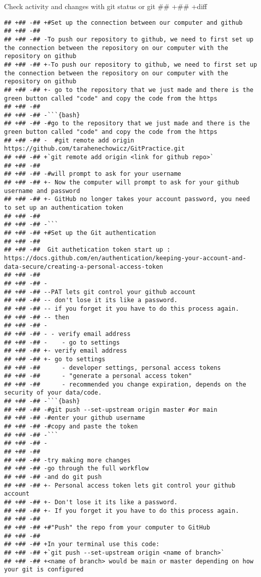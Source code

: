 \documentclass[ignorenonframetext,]{beamer}
\begin{document}
\begin{frame}[fragile]{Check activity and changes with git status or git
## +## +diff}
\begin{verbatim}
## +## -## +#Set up the connection between our computer and github
## +## -##  
## +## -## -To push our repository to github, we need to first set up the connection between the repository on our computer with the repository on github
## +## -## +-To push our repository to github, we need to first set up the connection between the repository on our computer with the repository on github
## +## -## +- go to the repository that we just made and there is the green button called "code" and copy the code from the https
## +## -##  
## +## -## -```{bash}
## +## -## -#go to the repository that we just made and there is the green button called "code" and copy the code from the https
## +## -## -  #git remote add origin https://github.com/tarahenechowicz/GitPractice.git
## +## -## +`git remote add origin <link for github repo>`
## +## -##  
## +## -## -#will prompt to ask for your username
## +## -## +- Now the computer will prompt to ask for your github username and password
## +## -## +- GitHub no longer takes your account password, you need to set up an authentication token
## +## -##  
## +## -## -```
## +## -## +#Set up the Git authentication 
## +## -##  
## +## -##  Git authetication token start up : https://docs.github.com/en/authentication/keeping-your-account-and-data-secure/creating-a-personal-access-token
## +## -##  
## +## -## -
## +## -## --PAT lets git control your github account
## +## -## -- don't lose it its like a password. 
## +## -## -- if you forget it you have to do this process again.
## +## -## -- then 
## +## -## -
## +## -## - - verify email address
## +## -## -    - go to settings
## +## -## +- verify email address
## +## -## +- go to settings
## +## -##      - developer settings, personal access tokens
## +## -##      - "generate a personal access token"
## +## -##      - recommended you change expiration, depends on the security of your data/code. 
## +## -## -```{bash}
## +## -## -#git push --set-upstream origin master #or main
## +## -## -#enter your github username
## +## -## -#copy and paste the token
## +## -## -```
## +## -## - 
## +## -##  
## +## -## -try making more changes
## +## -## -go through the full workflow
## +## -## -and do git push
## +## -## +- Personal access token lets git control your github account
## +## -## +- Don't lose it its like a password. 
## +## -## +- If you forget it you have to do this process again.
## +## -##  
## +## -## +#"Push" the repo from your computer to GitHub
## +## -##  
## +## -## +In your terminal use this code: 
## +## -## +`git push --set-upstream origin <name of branch>`
## +## -## +<name of branch> would be main or master depending on how your git is configured

\end{verbatim}
\end{frame}
\end{document}
